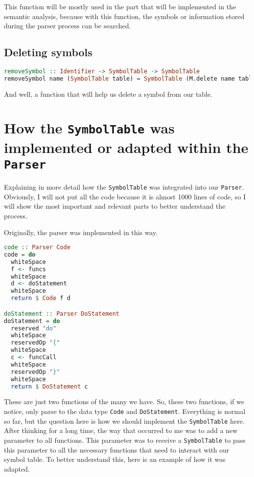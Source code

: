 \documentclass{article}
\newcommand{\code}[1]{\colorbox{codebackground}{\texttt{#1}}}
\begin{document}
This function will be mostly used in the part that will be implemented in the semantic analysis, because with this function, the symbols or information stored during the parser process can be searched.

\subsection{Deleting symbols}

\begin{lstlisting}[language=Haskell]
removeSymbol :: Identifier -> SymbolTable -> SymbolTable
removeSymbol name (SymbolTable table) = SymbolTable (M.delete name table)
\end{lstlisting}

And well, a function that will help us delete a symbol from our table.

\section{How the \code{SymbolTable} was implemented or adapted within the \code{Parser}}

Explaining in more detail how the \code{SymbolTable} was integrated into our \code{Parser}. Obviously, I will not put all the code because it is almost 1000 lines of code, so I will show the most important and relevant parts to better understand the process.

Originally, the parser was implemented in this way.

\begin{lstlisting}[language=Haskell]
code :: Parser Code
code = do
  whiteSpace
  f <- funcs
  whiteSpace
  d <- doStatement
  whiteSpace
  return $ Code f d

doStatement :: Parser DoStatement
doStatement = do
  reserved "do"
  whiteSpace
  reservedOp "{"
  whiteSpace
  c <- funcCall
  whiteSpace
  reservedOp "}"
  whiteSpace
  return $ DoStatement c
\end{lstlisting}

These are just two functions of the many we have. So, these two functions, if we notice, only parse to the data type \code{Code} and \code{DoStatement}. Everything is normal so far, but the question here is how we should implement the \code{SymbolTable} here. After thinking for a long time, the way that occurred to me was to add a new parameter to all functions. This parameter was to receive a \code{SymbolTable} to pass this parameter to all the necessary functions that need to interact with our symbol table. To better understand this, here is an example of how it was adapted.
\end{document}
